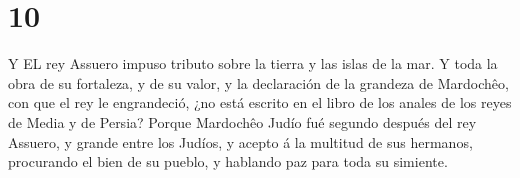 \hypertarget{section-9}{%
\section{10}\label{section-9}}

 Y EL rey Assuero impuso tributo sobre la tierra y las islas
de la mar.  Y toda la obra de su fortaleza, y de su valor, y
la declaración de la grandeza de Mardochêo, con que el rey le
engrandeció, ¿no está escrito en el libro de los anales de los reyes de
Media y de Persia?  Porque Mardochêo Judío fué segundo
después del rey Assuero, y grande entre los Judíos, y acepto á la
multitud de sus hermanos, procurando el bien de su pueblo, y hablando
paz para toda su simiente.
